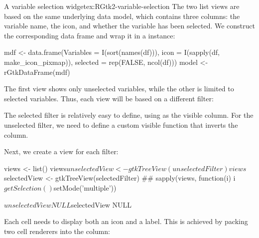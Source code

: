 \begin{example}{A variable selection widget}{ex:RGtk2-variable-selection}
The two list views are based on the same underlying data model, which
contains three columns: the variable name, the icon, and whether the
variable has been selected. We construct the corresponding data frame
and wrap it in a  instance:
\begin{Schunk}
\begin{Sinput}
 mdf <- data.frame(Variables = I(sort(names(df))),
                   icon = I(sapply(df, make_icon_pixmap)),
                   selected = rep(FALSE, ncol(df)))
 model <- rGtkDataFrame(mdf)
\end{Sinput}
\end{Schunk}

The first view shows only unselected variables, while the other is
limited to selected variables. Thus, each view will be based on a
different filter:
\begin{Schunk}
\end{Schunk}
%
The selected filter is relatively easy to define, using
 as the visible column. For the unselected filter, we
need to define a custom visible function that inverts the
 column.

Next, we create a view for each filter:
\begin{Schunk}
\begin{Sinput}
 views <- list()
 views$unselectedView <- gtkTreeView(unselectedFilter)
 views$selectedView <- gtkTreeView(selectedFilter)
 ##
 sapply(views, function(i) i$getSelection()$setMode('multiple'))
\end{Sinput}
\begin{Soutput}
$unselectedView
NULL

$selectedView
NULL
\end{Soutput}
\end{Schunk}

Each cell needs to display both an icon and a label.  This is achieved
by packing two cell renderers into the column:
\begin{Schunk}
\end{Schunk}


\end{example}
